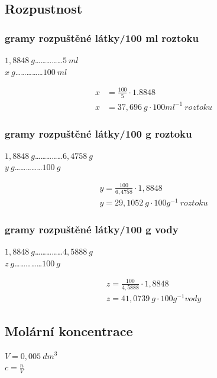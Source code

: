 \documentclass[13pt, a4paper, twoside]{article}
\begin{document}
\subsection*{Rozpustnost}
\subsubsection*{gramy rozpuštěné látky/100 ml roztoku}
\begin{center}
$1,8848 \:g$……………$5 \: ml$\\
$x\: g$……………$100 \: ml$
\end{center}

\begin{align*}
    x &= \frac{100}{5} \cdot 1.8848\\
    x &= 37,696 \: g\cdot 100ml^{-1}\: roztoku
\end{align*}

\subsubsection*{gramy rozpuštěné látky/100 g roztoku}
\begin{center}
$1,8848 \:g$……………$6,4758 \:g$\\
$y \:g$……………$100 \:g$
\end{center}

\begin{align*}
    y = \frac{100}{6,4758} \cdot 1,8848\\
    y = 29,1052\: g\cdot 100g^{-1} \: roztoku
\end{align*}

\subsubsection*{gramy rozpuštěné látky/100 g vody}
\begin{center}
$1,8848\: g$……………$4,5888\: g$\\
$z\: g$……………$100\: g$
\end{center}

\begin{align*}
    z = \frac{100}{4,5888} \cdot 1,8848\\
    z = 41,0739 \: g\cdot 100g^{-1} vody
\end{align*}

\subsection*{Molární koncentrace}
$V= 0,005 \: dm^3$\\
$c=\frac{n}{V}$
\end{document}
